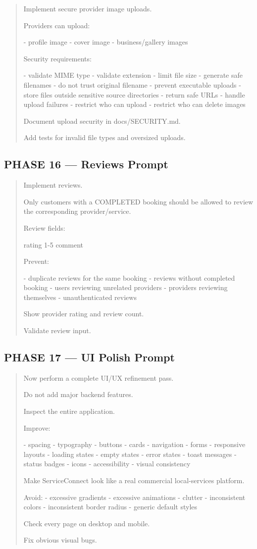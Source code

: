 \begin{quote}
Implement secure provider image uploads.

Providers can upload:

- profile image
- cover image
- business/gallery images

Security requirements:

- validate MIME type
- validate extension
- limit file size
- generate safe filenames
- do not trust original filename
- prevent executable uploads
- store files outside sensitive source directories
- return safe URLs
- handle upload failures
- restrict who can upload
- restrict who can delete images

Document upload security in docs/SECURITY.md.

Add tests for invalid file types and oversized uploads.
\end{quote}

\subsection*{PHASE 16 --- Reviews Prompt}

\begin{quote}
Implement reviews.

Only customers with a COMPLETED booking should be allowed to review
the corresponding provider/service.

Review fields:

rating 1-5
comment

Prevent:

- duplicate reviews for the same booking
- reviews without completed booking
- users reviewing unrelated providers
- providers reviewing themselves
- unauthenticated reviews

Show provider rating and review count.

Validate review input.
\end{quote}

\subsection*{PHASE 17 --- UI Polish Prompt}

\begin{quote}
Now perform a complete UI/UX refinement pass.

Do not add major backend features.

Inspect the entire application.

Improve:

- spacing
- typography
- buttons
- cards
- navigation
- forms
- responsive layouts
- loading states
- empty states
- error states
- toast messages
- status badges
- icons
- accessibility
- visual consistency

Make ServiceConnect look like a real commercial local-services platform.

Avoid:
- excessive gradients
- excessive animations
- clutter
- inconsistent colors
- inconsistent border radius
- generic default styles

Check every page on desktop and mobile.

Fix obvious visual bugs.
\end{quote}

